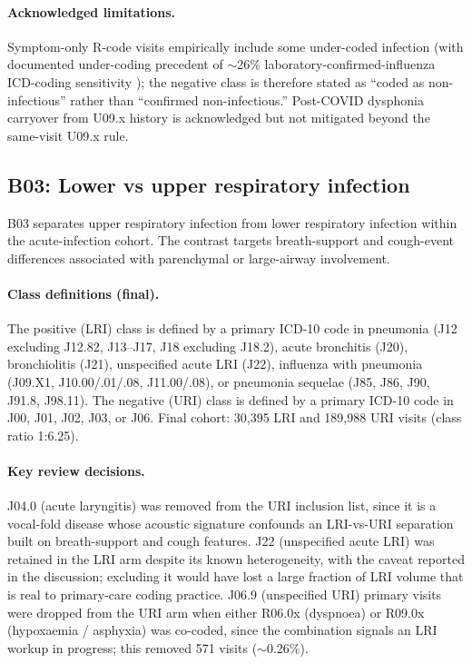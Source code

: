 \documentclass[utf8]{frontiers_suppmat} %
\begin{document}
\paragraph{Acknowledged limitations.} Symptom-only R-code visits
empirically include some under-coded infection (with documented
under-coding precedent of $\sim$26\% laboratory-confirmed-influenza
ICD-coding sensitivity \citep{flu-icd-coding-sensitivity-26pct}); the negative class is therefore stated as
``coded as non-infectious'' rather than ``confirmed non-infectious.''
Post-COVID dysphonia carryover from U09.x history is acknowledged but
not mitigated beyond the same-visit U09.x rule.

\subsection{B03: Lower vs upper respiratory infection}
\label{sec:supp-b03}

B03 separates upper respiratory infection from lower respiratory
infection within the acute-infection cohort. The contrast targets
breath-support and cough-event differences associated with parenchymal
or large-airway involvement.

\paragraph{Class definitions (final).} The positive (LRI) class is
defined by a primary ICD-10 code in pneumonia (J12 excluding J12.82,
J13--J17, J18 excluding J18.2), acute bronchitis (J20),
bronchiolitis (J21), unspecified acute LRI (J22), influenza with
pneumonia (J09.X1, J10.00/.01/.08, J11.00/.08), or pneumonia sequelae
(J85, J86, J90, J91.8, J98.11). The negative (URI) class is defined
by a primary ICD-10 code in J00, J01, J02, J03, or J06. Final cohort:
30{,}395 LRI and 189{,}988 URI visits (class ratio 1:6.25).

\paragraph{Key review decisions.} J04.0 (acute laryngitis) was
removed from the URI inclusion list, since it is a vocal-fold disease
whose acoustic signature confounds an LRI-vs-URI separation built on
breath-support and cough features. J22 (unspecified acute LRI) was
retained in the LRI arm despite its known heterogeneity, with the
caveat reported in the discussion; excluding it would have lost a
large fraction of LRI volume that is real to primary-care coding
practice. J06.9 (unspecified URI) primary visits were dropped from
the URI arm when either R06.0x (dyspnoea) or R09.0x (hypoxaemia /
asphyxia) was co-coded, since the combination signals an LRI workup
in progress; this removed 571 visits ($\sim$0.26\%).
\end{document}
